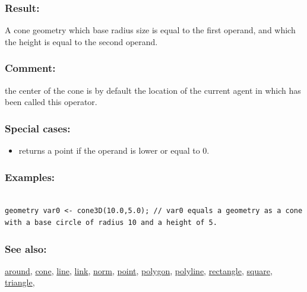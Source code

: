 \documentclass[]{book}
\providecommand{\tightlist}{%
  \setlength{\itemsep}{0pt}\setlength{\parskip}{0pt}}
\theoremstyle{definition}
\theoremstyle{definition}
\theoremstyle{definition}
\theoremstyle{remark}
\begin{document}
\subsubsection{Result:}\label{result-93}

A cone geometry which base radius size is equal to the first operand,
and which the height is equal to the second operand.

\subsubsection{Comment:}\label{comment-23}

the center of the cone is by default the location of the current agent
in which has been called this operator.

\subsubsection{Special cases:}\label{special-cases-31}

\begin{itemize}
\tightlist
\item
  returns a point if the operand is lower or equal to 0.
\end{itemize}

\subsubsection{Examples:}\label{examples-73}

\begin{verbatim}
 
geometry var0 <- cone3D(10.0,5.0); // var0 equals a geometry as a cone with a base circle of radius 10 and a height of 5.
\end{verbatim}

\subsubsection{See also:}\label{see-also-59}

\href{operators-a-to-a.html\#around}{around},
\href{operators-b-to-c.html\#cone}{cone},
\href{operators-i-to-m.html\#line}{line},
\href{operators-i-to-m.html\#link}{link},
\href{operators-n-to-r.html\#norm}{norm},
\href{operators-n-to-r.html\#point}{point},
\href{operators-n-to-r.html\#polygon}{polygon},
\href{operators-n-to-r.html\#polyline}{polyline},
\href{operators-n-to-r.html\#rectangle}{rectangle},
\href{operators-s-to-z.html\#square}{square},
\href{operators-s-to-z.html\#triangle}{triangle},
\end{document}
